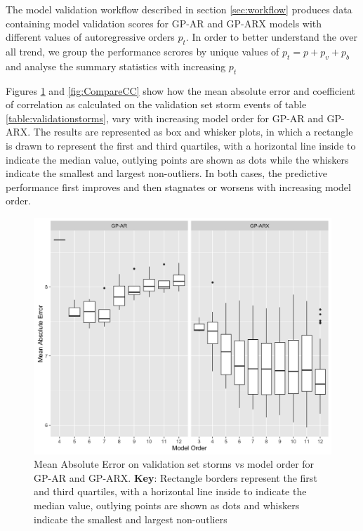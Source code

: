 \documentclass{article}
\begin{document}
The model validation workflow described in section \ref{sec:workflow}
produces data containing model validation scores for GP-AR and GP-ARX
models with different values of autoregressive orders $p_t$. In order
to better understand the over all trend, we group the performance
scrores by unique values of $p_t = p + p_v + p_b$ and analyse the
summary statistics with increasing $p_t$

Figures \ref{fig:CompareMae} and \ref{fig:CompareCC} show how the mean
absolute error and coefficient of correlation as calculated on the
validation set storm events of table \ref{table:validationstorms},
vary with increasing model order for GP-AR and GP-ARX. The results are
represented as box and whisker plots, in which a rectangle is drawn to
represent the first and third quartiles, with a horizontal line inside
to indicate the median value, outlying points are shown as dots while
the whiskers indicate the smallest and largest non-outliers. In both
cases, the predictive performance first improves and then stagnates or
worsens with increasing model order. 

\begin{figure}[h]
  \includegraphics[width=\textwidth]{Compare-mae.png}
  \caption{Mean Absolute Error on validation set storms vs model order for GP-AR and GP-ARX. \textbf{Key}: Rectangle borders represent the first and third quartiles, with a horizontal line inside to indicate the median value, outlying points are shown as dots and whiskers indicate the smallest and largest non-outliers}
  \label{fig:CompareMae}
\end{figure}
\end{document}
